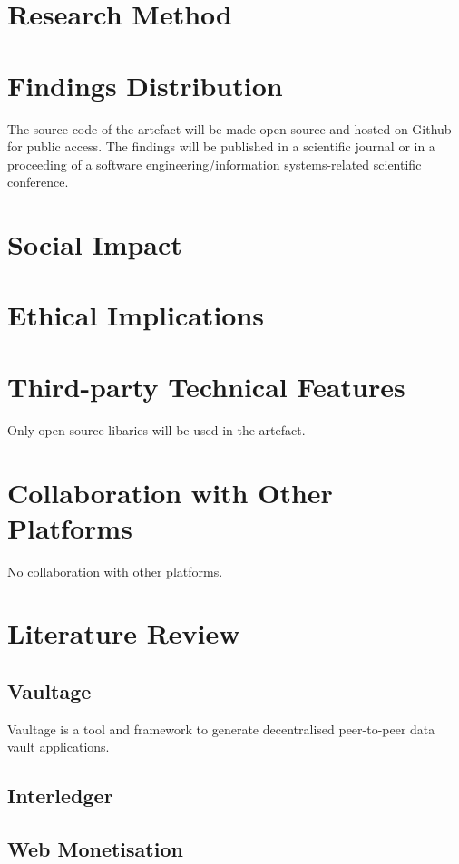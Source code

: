 \documentclass[]{article}
\begin{document}
\section{Research Method}


\section{Findings Distribution}
The source code of the artefact will be made open source and hosted on Github for public access. The findings will be published in a scientific journal or in a proceeding of a software engineering/information systems-related scientific conference.  

\section{Social Impact}

\section{Ethical Implications}

\section{Third-party Technical Features}
Only open-source libaries will be used in the artefact.  

\section{Collaboration with Other Platforms}
No collaboration with other platforms.

\section{Literature Review}

\subsection{Vaultage}
Vaultage is a tool and framework to generate decentralised peer-to-peer data vault applications. 

\subsection{Interledger}

\subsection{Web Monetisation}
\end{document}
